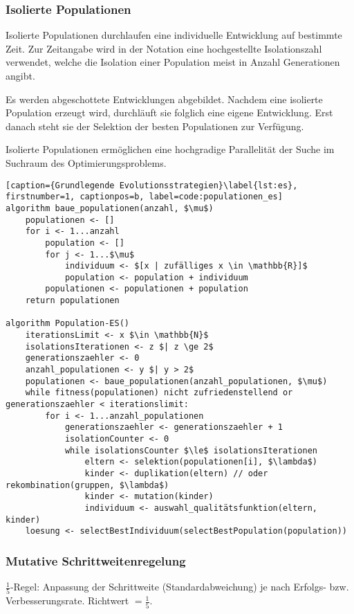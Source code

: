 \subsubsection{Isolierte Populationen}

Isolierte Populationen durchlaufen eine individuelle Entwicklung auf bestimmte Zeit.
Zur Zeitangabe wird in der Notation eine hochgestellte Isolationszahl verwendet, welche die Isolation einer Population meist in Anzahl Generationen angibt.

Es werden abgeschottete Entwicklungen abgebildet.
Nachdem eine isolierte Population erzeugt wird, durchläuft sie folglich eine eigene Entwicklung.
Erst danach steht sie der Selektion der besten Populationen zur Verfügung.

Isolierte Populationen ermöglichen eine hochgradige Parallelität der Suche im Suchraum des Optimierungsproblems.

\begin{lstlisting}[caption={Grundlegende Evolutionsstrategien}\label{lst:es}, firstnumber=1, captionpos=b, label=code:populationen_es]
algorithm baue_populationen(anzahl, $\mu$)
	populationen <- []
	for i <- 1...anzahl
		population <- []	
		for j <- 1...$\mu$
			individuum <- $[x | zufälliges x \in \mathbb{R}]$
			population <- population + individuum
		populationen <- populationen + population
	return populationen

algorithm Population-ES()
	iterationsLimit <- x $\in \mathbb{N}$
	isolationsIterationen <- z $| z \ge 2$
	generationszaehler <- 0
	anzahl_populationen <- y $| y > 2$
	populationen <- baue_populationen(anzahl_populationen, $\mu$)
	while fitness(populationen) nicht zufriedenstellend or generationszaehler < iterationslimit:
		for i <- 1...anzahl_populationen
			generationszaehler <- generationszaehler + 1
			isolationCounter <- 0			
			while isolationsCounter $\le$ isolationsIterationen
				eltern <- selektion(populationen[i], $\lambda$)
				kinder <- duplikation(eltern) // oder rekombination(gruppen, $\lambda$)
				kinder <- mutation(kinder)
				individuum <- auswahl_qualitätsfunktion(eltern, kinder)
	loesung <- selectBestIndividuum(selectBestPopulation(population))
\end{lstlisting}

\subsubsection{Mutative Schrittweitenregelung}

$\frac{1}{5}$-Regel: Anpassung der Schrittweite (Standardabweichung) je nach Erfolgs- bzw. Verbesserungsrate. Richtwert $= \frac{1}{5}$.

